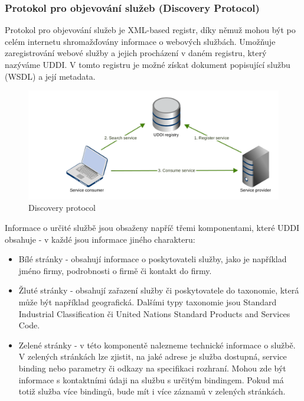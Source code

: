 \documentclass[11pt,twoside,a4paper]{book}
\begin{document}
\subsubsection{Protokol pro objevování služeb (Discovery Protocol)}
Protokol pro objevování služeb je XML-based registr, díky němuž mohou být po celém
internetu shromažďovány informace o webových službách. Umožňuje zaregistrování webové
služby a jejich procházení v daném registru, který nazýváme UDDI. V tomto registru je
možné získat dokument popisující službu (WSDL) a její metadata.

\begin{figure}[h]
\begin{center}
\includegraphics[width=13cm]{images-pdf/uddi.pdf} 
\caption{Discovery protocol}
\label{fig:logo}
\end{center}
\end{figure}

Informace o určité službě jsou obsaženy napříč třemi komponentami, které UDDI obsahuje -
v každé jsou informace jiného charakteru:

\begin{itemize}
  \item Bílé stránky - obsahují informace o poskytovateli služby, jako je například jméno
firmy, podrobnosti o firmě či kontakt do firmy.

  \item Žluté stránky - obsahují zařazení služby či poskytovatele do taxonomie, která může
být například geografická. Dalšími typy taxonomie jsou Standard Industrial
Classification či United Nations Standard Products and Services Code.

  \item Zelené stránky - v této komponentě nalezneme technické informace o službě. V
zelených stránkách lze zjistit, na jaké adrese je služba dostupná, service binding nebo
parametry či odkazy na specifikaci rozhraní. Mohou zde být informace s kontaktními
údaji na službu s určitým bindingem. Pokud má totiž služba více bindingů, bude mít i
více záznamů v zelených stránkách.

\end{itemize}
\end{document}
